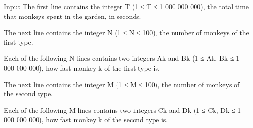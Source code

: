 Input
The first line contains the integer T (1 ≤ T ≤ 1 000 000 000), the total time that monkeys spent in the garden, in seconds.  

   The next line contains the integer N (1 ≤ N ≤ 100), the number of monkeys of the first type.  

   Each of the following N lines contains two integers Ak and Bk (1 ≤ Ak, Bk ≤ 1 000 000 000), how fast monkey k of the first type is.  

   The next line contains the integer M (1 ≤ M ≤ 100), the number of monkeys of the second type.  

   Each of the following M lines contains two integers Ck and Dk (1 ≤ Ck, Dk ≤ 1 000 000 000), how fast monkey k of the second type is.